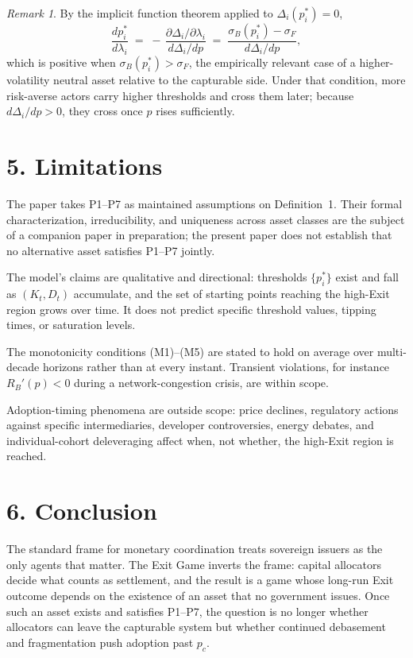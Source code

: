 \documentclass[12pt]{article}
\theoremstyle{definition}
\theoremstyle{remark}
\newtheorem*{remark}{Remark}
\begin{document}
\begin{remark}
By the implicit function theorem applied to
$\Delta_i(p_i^*) = 0$,
\[
\frac{dp_i^*}{d\lambda_i}
\;=\;
-\,\frac{\partial \Delta_i / \partial \lambda_i}{d \Delta_i / dp}
\;=\;
\frac{\sigma_B(p_i^*) - \sigma_F}{d \Delta_i / dp},
\]
which is positive when $\sigma_B(p_i^*) > \sigma_F$, the
empirically relevant case of a higher-volatility neutral asset
relative to the capturable side. Under that condition, more
risk-averse actors carry higher thresholds and cross them later;
because $d\Delta_i/dp > 0$, they cross once $p$ rises
sufficiently.
\end{remark}


\section{5. Limitations}

The paper takes P1--P7 as maintained assumptions on Definition~1. Their formal characterization, irreducibility, and uniqueness across asset classes are the subject of a companion paper in preparation; the present paper does not establish that no alternative asset satisfies P1--P7 jointly.

The model's claims are qualitative and directional: thresholds $\{p_i^*\}$ exist and fall as $(K_t, D_t)$ accumulate, and the set of starting points reaching the high-Exit region grows over time. It does not predict specific threshold values, tipping times, or saturation levels.

The monotonicity conditions (M1)--(M5) are stated to hold on average over multi-decade horizons rather than at every instant. Transient violations, for instance $R_B'(p) < 0$ during a network-congestion crisis, are within scope.

Adoption-timing phenomena are outside scope: price declines, regulatory actions against specific intermediaries, developer controversies, energy debates, and individual-cohort deleveraging affect when, not whether, the high-Exit region is reached.

\section{6. Conclusion}

The standard frame for monetary coordination treats sovereign issuers as the only agents that matter. The Exit Game inverts the frame: capital allocators decide what counts as settlement, and the result is a game whose long-run Exit outcome depends on the existence of an asset that no government issues. Once such an asset exists and satisfies P1--P7, the question is no longer whether allocators can leave the capturable system but whether continued debasement and fragmentation push adoption past $p_c$.
\end{document}

